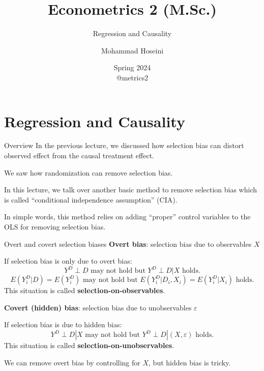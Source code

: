 \documentclass[handout]{beamer}
\begin{document}
	\title[Econometrics 2]{Econometrics 2 (M.Sc.)}
	\subtitle{Regression and Causality}
	\author[Mohammad Hoseini]{Mohammad Hoseini}
	
	
	\date[Spring 2024]{Spring 2024 \\
	\vspace{10pt} @metrics2
}
	
\begin{frame}[plain]
	\titlepage
\end{frame}


\section{Regression and Causality}

\begin{frame}{Overview}
In the previous lecture, we discussed how selection bias can distort observed effect from the causal treatment effect.\bigskip

We saw how randomization can remove selection bias.\bigskip

In this lecture, we talk over another basic method to remove selection bias which is called ``conditional independence assumption'' (CIA).\bigskip

In simple words, this method relies on adding ``proper'' control variables to the OLS for removing selection bias.
\end{frame}

\begin{frame}{Overt and covert selection biases}
\textbf{Overt bias}: selection bias due to observables $X$\medskip

If selection bias is only due to overt bias: 
\[Y^D\perp D \text{ may not hold but } Y^D\perp D | X \text{ holds.}\] 
\[E(Y^D_i| D)=E(Y^D_i) \text{ may not hold but } E(Y^D_i| D_i,X_i)=E(Y_i^D|X_i) \text{ holds.}\] This situation is called \textbf{selection-on-observables}.\bigskip\pause

\textbf{Covert (hidden) bias}: selection bias due to unobservables $\varepsilon$\medskip

If selection bias is due to hidden bias:
\[Y^D\perp D|X \text{ may not hold but } Y^D\perp D | (X,\varepsilon) \text{ holds.}\]This situation is called \textbf{selection-on-unobservables}.\medskip

We can remove overt bias by controlling for $X$, but hidden bias is tricky. 
\end{frame}
\end{document}
